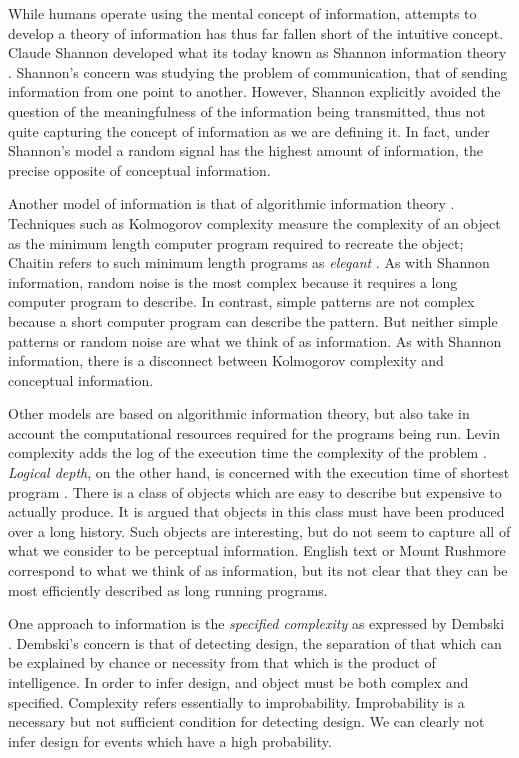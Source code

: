 While humans operate using the mental concept of information, attempts to develop a theory of information has thus far fallen short of the intuitive concept.
Claude Shannon developed what its today known as Shannon information theory \citep{Shannon1948}.
Shannon's concern was studying the problem of communication, that of sending information from one point to another.
However, Shannon explicitly avoided the question of the meaningfulness of the information being transmitted, thus not quite capturing the concept of information as we are defining it.
In fact, under Shannon's model a random signal has the highest amount of information, the precise opposite of conceptual information.

Another model of information is that of algorithmic information theory \citep{Chaitin1966, Solomonoff1960, Kolmogorov1968a}.
Techniques such as Kolmogorov complexity measure the complexity of an object as the minimum length computer program required to recreate the object; Chaitin refers to such minimum length programs as \textit{elegant} \cite{Chaitin2002}.
As with Shannon information, random noise is the most complex because it requires a long computer program to describe.
In contrast, simple patterns are not complex because a short computer program can describe the pattern.
But neither simple patterns or random noise are what we think of as information.
As with Shannon information, there is a disconnect between Kolmogorov complexity and conceptual information.

Other models are based on algorithmic information theory, but also take in account the computational resources required for the programs being run.
Levin complexity adds the log of the execution time the complexity of the problem \citep{Levin1976}.
\textit{Logical depth}, on the other hand, is concerned with the execution time of shortest program \citep{Bennett1988}.
There is a class of objects which are easy to describe but expensive to actually produce.
It is argued that objects in this class must have been produced over a long history.
Such objects are interesting, but do not seem to capture all of what we consider to be perceptual information.
English text or Mount Rushmore correspond to what we think of as information, but its not clear that they can be most efficiently described as long running programs.

One approach to information is the \textit{specified complexity} as expressed by Dembski \citep{Dembski1998}.
Dembski's concern is that of detecting design, the separation of that which can be explained by chance or necessity from that which is the product of intelligence. 
In order to infer design, and object must be both complex and specified.
Complexity refers essentially to improbability.
Improbability is a necessary but not sufficient condition for detecting design.
We can clearly not infer design for events which have a high probability.

